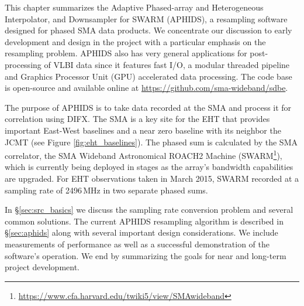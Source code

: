 This chapter summarizes the Adaptive Phased-array and Heterogeneous 
Interpolator, and Downsampler for SWARM (APHIDS), a resampling software designed for 
phased SMA data products.  We concentrate our discussion to early development and design in the project with 
a particular emphasis on the resampling problem.  APHIDS also has very general applications for 
post-processing of VLBI data since it features fast I/O, a modular threaded pipeline 
and Graphics Processor Unit (GPU) accelerated data processing.  The code base is open-source and available 
online at \url{https://github.com/sma-wideband/sdbe}.

The purpose of APHIDS is to take data recorded at the SMA and process it for correlation using
DIFX.  The SMA is a key site for the EHT that provides important East-West baselines and a near zero baseline 
with its neighbor the JCMT (see Figure \ref{fig:eht_baselines}).  The phased sum is calculated by the SMA correlator, the SMA Wideband Astronomical 
ROACH2 Machine (SWARM\footnote{\url{https://www.cfa.harvard.edu/twiki5/view/SMAwideband}}),
which is currently being deployed in stages as the array's bandwidth capabilities are 
upgraded.  For EHT observations taken in March 2015, SWARM recorded at a sampling rate of 2496\,MHz in 
two separate phased sums.

In \S\ref{sec:src_basics} we discuss the sampling rate conversion problem and several common solutions.
The current APHIDS resampling algorithm is described in \S\ref{sec:aphids} along with several important
design considerations.  We include measurements of performance as well as a successful
demonstration of the software's operation.  We end by summarizing the goals for near and long-term project 
development.


